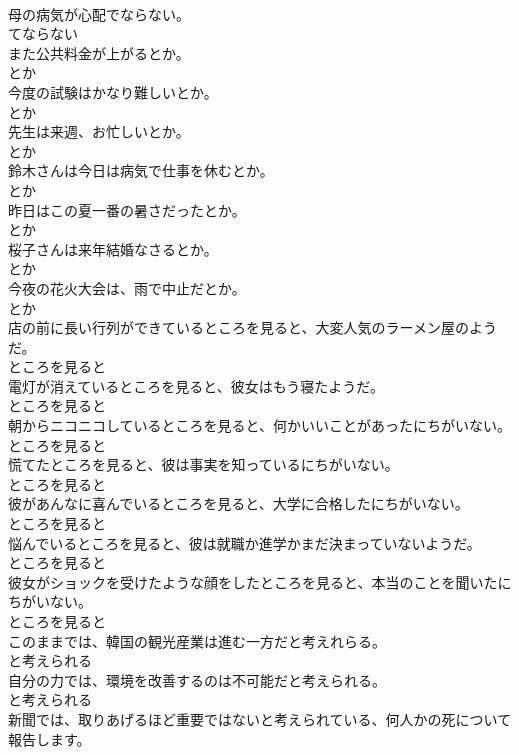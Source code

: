\documentclass[8pt]{extreport}
\begin{document}
\begin{CJK}{UTF8}{min}
\\	母の病気が心配でならない。	
\\	てならない	
\\	また公共料金が上がるとか。	
\\	とか	
\\	今度の試験はかなり難しいとか。	
\\	とか	
\\	先生は来週、お忙しいとか。	
\\	とか	
\\	鈴木さんは今日は病気で仕事を休むとか。	
\\	とか	
\\	昨日はこの夏一番の暑さだったとか。	
\\	とか	
\\	桜子さんは来年結婚なさるとか。	
\\	とか	
\\	今夜の花火大会は、雨で中止だとか。	
\\	とか	
\\	店の前に長い行列ができているところを見ると、大変人気のラーメン屋のようだ。	
\\	ところを見ると	
\\	電灯が消えているところを見ると、彼女はもう寝たようだ。	
\\	ところを見ると	
\\	朝からニコニコしているところを見ると、何かいいことがあったにちがいない。	
\\	ところを見ると	
\\	慌てたところを見ると、彼は事実を知っているにちがいない。	
\\	ところを見ると	
\\	彼があんなに喜んでいるところを見ると、大学に合格したにちがいない。	
\\	ところを見ると	
\\	悩んでいるところを見ると、彼は就職か進学かまだ決まっていないようだ。	
\\	ところを見ると	
\\	彼女がショックを受けたような顔をしたところを見ると、本当のことを聞いたにちがいない。	
\\	ところを見ると	
\\	このままでは、韓国の観光産業は進む一方だと考えれらる。	
\\	と考えられる	
\\	自分の力では、環境を改善するのは不可能だと考えられる。	
\\	と考えられる	
\\	新聞では、取りあげるほど重要ではないと考えられている、何人かの死について報告します。	

\end{CJK}
\end{document}
